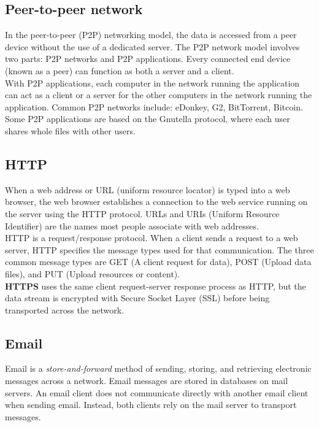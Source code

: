 {\subsection{Peer-to-peer network}

In the peer-to-peer (P2P) networking model, the data is accessed from a peer device without the use of a dedicated server. The P2P network model involves two parts: P2P networks and P2P applications. Every connected end device (known as a peer) can function as both a server and a client. \\

With P2P applications, each computer in the network running the application can act as a client or a server for the other computers in the network running the application. Common P2P networks include: eDonkey, G2, BitTorrent, Bitcoin. Some P2P applications are based on the Gnutella protocol, where each user shares whole files with other users. 

\subsection{HTTP}

When a web address or URL (uniform resource locator) is typed into a web browser, the web browser establishes a connection to the web service running on the server using the HTTP protocol. URLs and URIs (Uniform Resource Identifier) are the names most people associate with web addresses.\\

HTTP is a request/response protocol. When a client sends a request to a web server, HTTP specifies the message types used for that communication. The three common message types are GET (A client request for data), POST (Upload data files), and PUT (Upload resources or content).\\

\textbf{HTTPS} uses the same client request-server response process as HTTP, but the data stream is encrypted with Secure Socket Layer (SSL) before being transported across the network.

\subsection{Email}

Email is a \emph{store-and-forward} method of sending, storing, and retrieving electronic messages across a network. Email messages are stored in databases on mail servers. An email client does not communicate directly with another email client when sending email. Instead, both clients rely on the mail server to transport messages. \\

}
